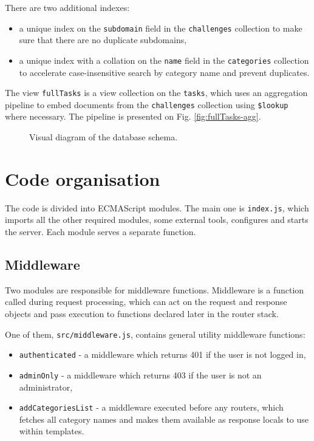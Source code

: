 There are two additional indexes:

\begin{itemize}
    \item a unique index on the \texttt{subdomain} field in the \texttt{challenges} collection to make sure that there are no duplicate subdomains,
    \item a unique index with a collation on the \texttt{name} field in the \texttt{categories} collection to accelerate case-insensitive search by category name and prevent duplicates.
\end{itemize}

The view \texttt{fullTasks} is a view collection on the \texttt{tasks}, which uses an aggregation pipeline to embed documents from the \texttt{challenges} collection using \texttt{\$lookup} where necessary. The pipeline is presented on Fig. \ref{fig:fullTasks-agg}.

\begin{figure}
    \centering
    
    \caption{Visual diagram of the database schema.}
    \label{fig:db-schema}
\end{figure}

\section{Code organisation}

The code is divided into ECMAScript modules. The main one is \texttt{index.js}, which imports all the other required modules, some external tools, configures and starts the server. Each module serves a separate function.

\subsection{Middleware}

Two modules are responsible for middleware functions. Middleware is a function called during request processing, which can act on the request and response objects and pass execution to functions declared later in the router stack.

One of them, \texttt{src/middleware.js}, contains general utility middleware functions:

\begin{itemize}
    \item \texttt{authenticated} - a middleware which returns 401 if the user is not logged in,
    \item \texttt{adminOnly} - a middleware which returns 403 if the user is not an administrator,
    \item \texttt{addCategoriesList} - a middleware executed before any routers, which fetches all category names and makes them available as response locals to use within templates.
\end{itemize}

